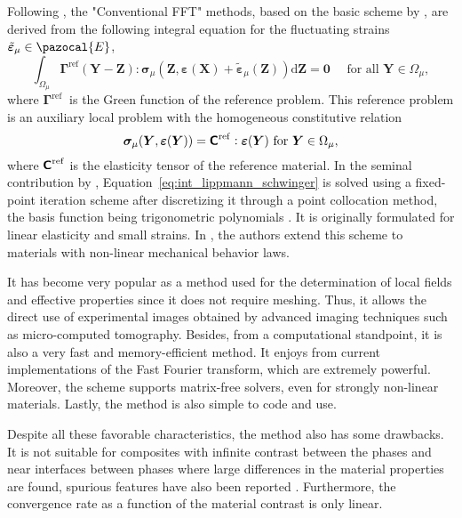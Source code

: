Following \cite{zeman_finite_2017}, the "Conventional FFT" methods, based on the basic scheme by \cite{moulinec_fast_1994}, are derived from the following integral equation for the fluctuating strains \(\tilde{\bm\varepsilon}_\mu \in \pazocal{E}\),
\begin{equation} \label{eq:int_lippmann_schwinger}
\int_{\Omega_\mu} \bm \Gamma^{\mathrm{ref}}(\bm{Y}-\bm{Z}): \bm{\sigma}_\mu\left(\bm{Z}, \bm{\varepsilon}(\bm X)+\tilde{\bm \varepsilon}_\mu(\bm{Z})\right) \mathrm{d} \bm{Z}=\mathbf{0}\quad \text { for all } \bm{Y} \in \Omega_\mu,
\end{equation}
where \(\bm \Gamma^{\text {ref }}\) is the Green function of the reference problem.
This reference problem is an auxiliary local problem with the homogeneous constitutive relation
\begin{equation}
\bm \sigma_\mu(\bm{Y}, \bm \varepsilon(\bm{Y}))=\boldsymbol{\mathsf{C}}^{\mathrm{ref}}: \bm\varepsilon(\bm{Y}) \text { for } \bm{Y} \in \Omega_\mu,
\end{equation}
where \(\boldsymbol{\mathsf{C}}^\mathrm{ref}\) is the elasticity tensor of the reference material.
In the seminal contribution by \cite{moulinec_fast_1994, moulinec_fft-based_1995}, Equation~\eqref{eq:int_lippmann_schwinger} is solved using a fixed-point iteration scheme after discretizing it through a point collocation method, the basis function being trigonometric polynomials \citep{zeman_finite_2017}.
It is originally formulated for linear elasticity and small strains.
In \cite{michel_computational_2000, michel_computational_2001}, the authors extend this scheme to materials with non-linear mechanical behavior laws.

It has become very popular as a method used for the determination of local fields and effective properties since it does not require meshing.
Thus, it allows the direct use of experimental images obtained by advanced imaging techniques such as micro-computed tomography.
Besides, from a computational standpoint, it is also a very fast and memory-efficient method.
It enjoys from current implementations of the Fast Fourier transform, which are extremely powerful.
Moreover, the scheme supports matrix-free solvers, even for strongly non-linear materials.
Lastly, the method is also simple to code and use.

Despite all these favorable characteristics, the method also has some drawbacks.
It is not suitable for composites with infinite contrast between the phases and near interfaces between phases where large differences in the material properties are found, spurious features have also been reported \citep{ma_numerical_2021}.
Furthermore, the convergence rate as a function of the material contrast is only linear.


